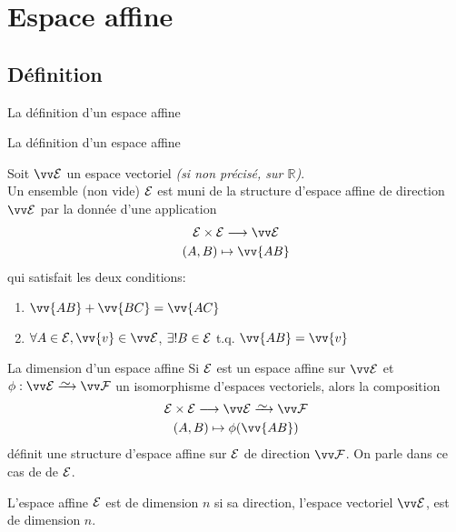 \documentclass{m53beamer}
\begin{document}
\section{Espace affine}
\subsection{Définition}
\begin{frame}{La définition d'un espace affine}
  \begin{definition}[heuristique]
  \end{definition}
\end{frame}
\begin{frame}{La définition d'un espace affine}
  \begin{definition}
    Soit $\ev{E}$ un espace vectoriel \emph{(si non précisé, sur $\mathbb{R}$)}.\pause\\
    Un ensemble (non vide) $\mathcal{E}$ est muni de la structure d'\alert{espace affine de direction $\ev{E}$}
    par la donnée d'une application
    \begin{gather*}
      \ens{E} \times \ens{E} \longrightarrow \ev{E}\\
      (A,B) \mapsto \vv{AB}
    \end{gather*}\pause
    qui satisfait les deux conditions:
    \begin{enumerate}[<+(1)->]
      \item $\vv{AB}+\vv{BC}=\vv{AC}$ 
      \item $\forall A \in \ens{E}, \vv{v} \in \ev{E}$\pause , $\exists ! B \in \mathcal{E}$ t.q. $\vv{AB}=\vv{v}$
    \end{enumerate}
  \end{definition}
\end{frame}
\begin{frame}{La dimension d'un espace affine}
  Si $\mathcal{E}$ est un espace affine sur $\ev{E}$ et $\phi:\ev{E}\isoto\ev{F}$ un isomorphisme d'espaces vectoriels, alors la composition
    \begin{gather*}
      \ens{E} \times \ens{E} \longrightarrow \ev{E}\isoto\ev{F}\\
      (A,B) \mapsto \phi(\vv{AB})
    \end{gather*}
  définit une structure d'espace affine sur $\mathcal{E}$ de direction $\ev{F}$. \pause On parle dans ce cas de  de $\mathcal{E}$.
  \pause
  \begin{definition}
    L'espace affine $\mathcal{E}$ est de dimension $n$ si sa direction, l'espace vectoriel $\ev{E}$, est de dimension $n$.
  \end{definition}
\end{frame}
\end{document}

